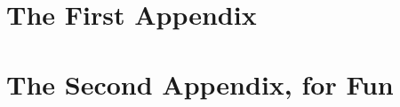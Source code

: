 \documentclass[12pt,twoside]{reedthesis}
\begin{document}
    \appendix
      \chapter{The First Appendix}
      \chapter{The Second Appendix, for Fun}



  \backmatter %

    \nocite{*}


%  
 

\end{document}

